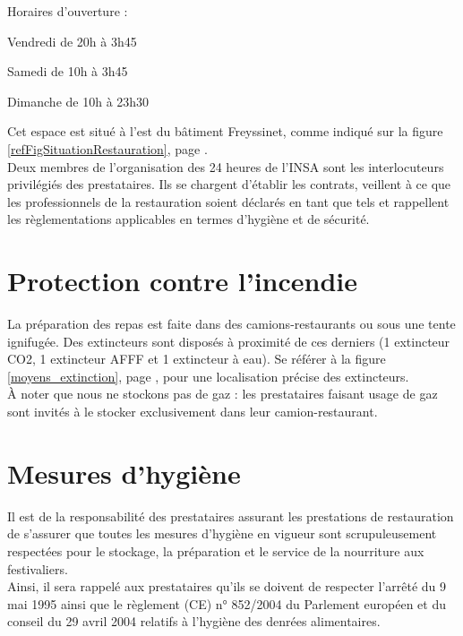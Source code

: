 \documentclass[hidelinks, paper=a4, fontsize=13pt]{report}
\begin{document}
Horaires d’ouverture :
\begin{list}{•}{}
	\item Vendredi de 20h à 3h45
	\item Samedi de 10h à 3h45
	\item Dimanche de 10h à 23h30
	
\end{list}

Cet espace est situé à l'est du bâtiment Freyssinet, comme indiqué sur la figure \ref{refFigSituationRestauration}, page \pageref{refFigSituationRestauration}.\\


Deux membres de l’organisation des 24 heures de l’INSA sont les interlocuteurs privilégiés des prestataires. Ils se chargent d'établir les contrats, veillent à ce que les professionnels de la restauration soient déclarés en tant que tels et rappellent les règlementations applicables en termes d'hygiène et de sécurité.\\

\section{Protection contre l’incendie}

La préparation des repas est faite dans des camions-restaurants ou sous une tente ignifugée. Des extincteurs sont disposés à proximité de ces derniers (1 extincteur CO2, 1 extincteur AFFF et 1 extincteur à eau). Se référer à la figure \ref{moyens_extinction}, page \pageref{moyens_extinction}, pour une localisation précise des extincteurs.\\ 

À noter que nous ne stockons pas de gaz : les prestataires faisant usage de gaz sont invités à le stocker exclusivement dans leur camion-restaurant.

\section{Mesures d’hygiène}

Il est de la responsabilité des prestataires assurant les prestations de restauration de s'assurer que toutes les mesures d'hygiène en vigueur sont scrupuleusement respectées pour le stockage, la préparation et le service de la nourriture aux festivaliers.\\

Ainsi, il sera rappelé aux prestataires qu'ils se doivent de respecter l'arrêté du 9 mai 1995 ainsi que le règlement (CE) n° 852/2004 du Parlement européen et du conseil du 29 avril 2004 relatifs à l'hygiène des denrées alimentaires.\\
\end{document}
